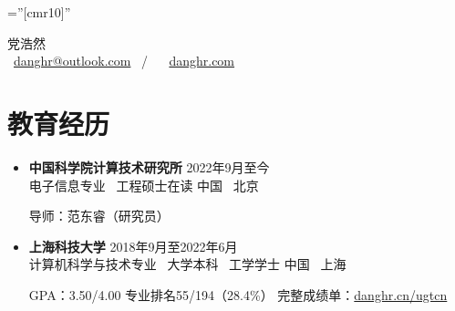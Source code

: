 \documentclass[a4paper,10pt]{ctexart} %
\begin{document}
\pagestyle{empty} %

\font\fb=''[cmr10]'' %



\begin{center}
    {\LARGE 党浩然} \\
     \  \href{mailto:danghr@outlook.com}{danghr@outlook.com} \  / \   \  \href{https://www.danghr.com}{danghr.com} \\
\end{center}



\section{教育经历}

    \begin{itemize}
        \item \textbf{中国科学院计算技术研究所} \hfill 2022年9月至今\\
        电子信息专业 \, 工程硕士在读 \hfill 中国 \, 北京 \\
        \begin{small}
            导师：范东睿（研究员）
        \end{small}
        \item \textbf{上海科技大学} \hfill 2018年9月至2022年6月\\
        计算机科学与技术专业 \, 大学本科 \  工学学士        \hfill 中国 \, 上海 \\
        \begin{small}
            GPA：3.50/4.00 \quad 专业排名55/194（28.4\%） \quad
            完整成绩单：\href{https://danghr.cn/ugtcn}{danghr.cn/ugtcn}
        \end{small}
    \end{itemize}


\end{document}

